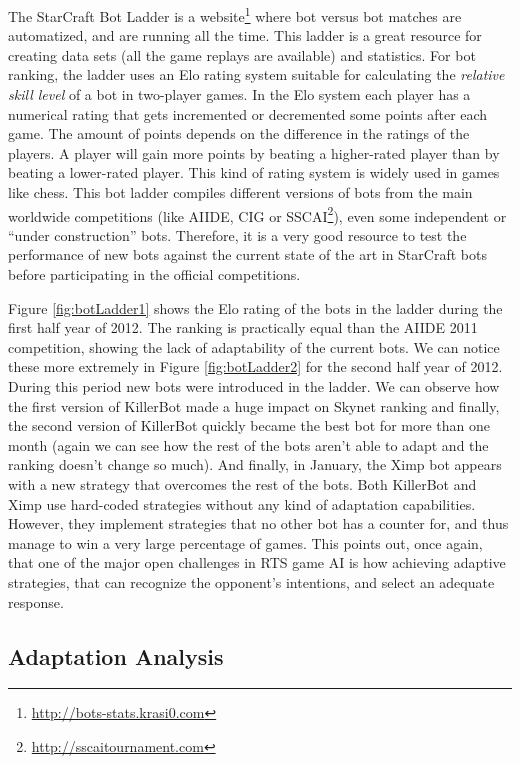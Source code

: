 \documentclass[journal]{IEEEtran}
\begin{document}
The StarCraft Bot Ladder is a website\footnote{\url{http://bots-stats.krasi0.com}} where bot versus bot matches are automatized, and are running all the time. This ladder is a great resource for creating data sets (all the game replays are available) and statistics. For bot ranking, the ladder uses an Elo rating system suitable for calculating the \emph{relative skill level} of a bot in two-player games. In the Elo system each player has a numerical rating that gets incremented or decremented some points after each game. The amount of points depends on the difference in the ratings of the players. A player will gain more points by beating a higher-rated player than by beating a lower-rated player. This kind of rating system is widely used in games like chess. This bot ladder compiles different versions of bots from the main worldwide competitions (like AIIDE, CIG or SSCAI\footnote{\url{http://sscaitournament.com}}), even some independent or ``under construction'' bots. Therefore, it is a very good resource to test the performance of new bots against the current state of the art in StarCraft bots before participating in the official competitions.

Figure \ref{fig:botLadder1} shows the Elo rating of the bots in the ladder during the first half year of 2012. The ranking is practically equal than the AIIDE 2011 competition, showing the lack of adaptability of the current bots. We can notice these more extremely in Figure \ref{fig:botLadder2} for the second half year of 2012. During this period new bots were introduced in the ladder. We can observe how the first version of KillerBot made a huge impact on Skynet ranking and finally, the second version of KillerBot quickly became the best bot for more than one month (again we can see how the rest of the bots aren't able to adapt and the ranking doesn't change so much). And finally, in January, the Ximp bot appears with a new strategy that overcomes the rest of the bots. Both KillerBot and Ximp use hard-coded strategies without any kind of adaptation capabilities. However, they implement strategies that no other bot has a counter for, and thus manage to win a very large percentage of games. This points out, once again, that one of the major open challenges in RTS game AI is how achieving adaptive strategies, that can recognize the opponent's intentions, and select an adequate response.


\subsection{Adaptation Analysis}
\end{document}

